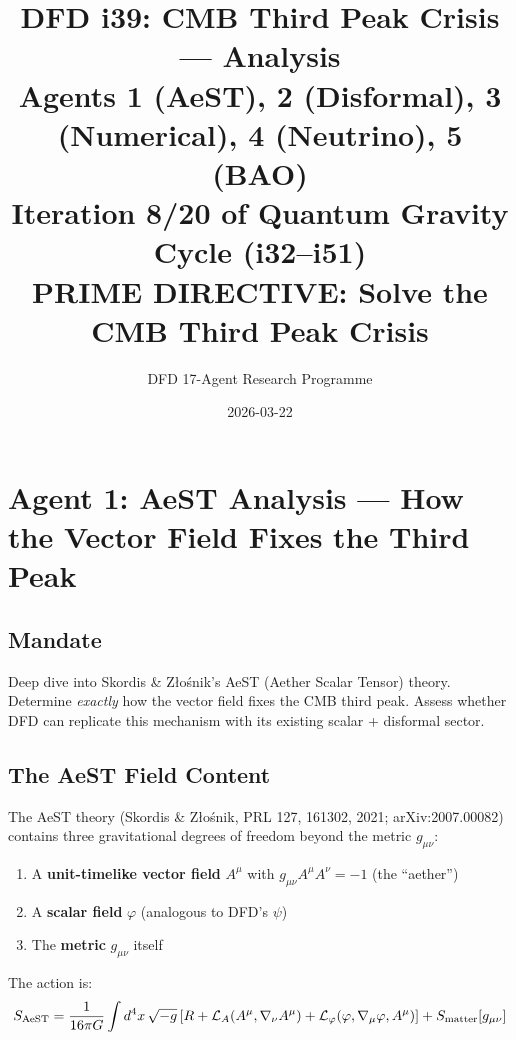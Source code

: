 \documentclass[11pt,a4paper]{article}
\title{DFD i39: CMB Third Peak Crisis --- Analysis\\[6pt]
\large Agents 1 (AeST), 2 (Disformal), 3 (Numerical), 4 (Neutrino), 5 (BAO)\\[6pt]
\normalsize Iteration 8/20 of Quantum Gravity Cycle (i32--i51)\\
PRIME DIRECTIVE: Solve the CMB Third Peak Crisis}
\author{DFD 17-Agent Research Programme}
\date{2026-03-22}
\begin{document}
\maketitle
\tableofcontents
\newpage

\section{Agent 1: AeST Analysis --- How the Vector Field Fixes the Third Peak}
\label{sec:agent1}

\subsection{Mandate}

Deep dive into Skordis \& Z{\l}o\'{s}nik's AeST (Aether Scalar Tensor) theory. Determine \emph{exactly} how the vector field fixes the CMB third peak. Assess whether DFD can replicate this mechanism with its existing scalar + disformal sector.

\subsection{The AeST Field Content}

The AeST theory (Skordis \& Z{\l}o\'{s}nik, PRL 127, 161302, 2021; arXiv:2007.00082) contains three gravitational degrees of freedom beyond the metric $g_{\mu\nu}$:

\begin{enumerate}
\item A \textbf{unit-timelike vector field} $A^\mu$ with $g_{\mu\nu}A^\mu A^\nu = -1$ (the ``aether'')
\item A \textbf{scalar field} $\varphi$ (analogous to DFD's $\psi$)
\item The \textbf{metric} $g_{\mu\nu}$ itself
\end{enumerate}

The action is:
\begin{equation}
S_{\rm AeST} = \frac{1}{16\pi G}\int d^4x\,\sqrt{-g}\left[R + \mathcal{L}_A(A^\mu, \nabla_\nu A^\mu) + \mathcal{L}_\varphi(\varphi, \nabla_\mu\varphi, A^\mu)\right] + S_{\rm matter}[g_{\mu\nu}]
\end{equation}
\end{document}
